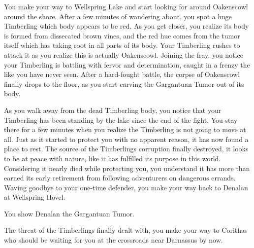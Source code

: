 You make your way to Wellspring Lake and start looking for around Oakenscowl around the shore. After a few minutes of wandering about, you spot a huge Timberling which body appears to be red. As you get closer, you realize its body is formed from dissecated brown vines, and the red hue comes from the tumor itself which has taking root in all parts of its body. Your Timberling rushes to attack it as you realize this is actually Oakenscowl. Joining the fray, you notice your Timberling is battling with fervor and determination, caught in a frenzy the like you have never seen. After a hard-fought battle, the corpse of Oakenscowl finally drops to the floor, as you start carving the Gargantuan Tumor out of its body.

As you walk away from the dead Timberling body, you notice that your Timberling has been standing by the lake since the end of the fight. You stay there for a few minutes when you realize the Timberling is not going to move at all. Just as it started to protect you with no apparent reason, it has now found a place to rest. The source of the Timberlings corruption finally destroyed, it looks to be at peace with nature, like it has fulfilled its purpose in this world. Considering it nearly died while protecting you, you understand it has more than earned its early retirement from following adventurers on dangerous errands. Waving goodbye to your one-time defender, you make your way back to Denalan at Wellspring Hovel.


You show Denalan the Gargantuan Tumor.


The threat of the Timberlings finally dealt with, you make your way to Corithas who should be waiting for you at the crossroads near Darnassus by now.
